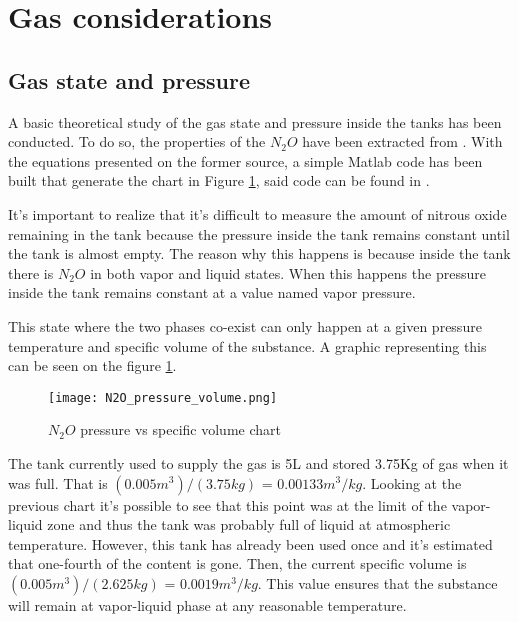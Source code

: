 
\section*{Gas considerations}

\subsection*{Gas state and pressure}

A basic theoretical study of the gas state and pressure inside the tanks has been conducted. To do so, the properties of the $N_2O$ have been extracted from \cite{n2oReference}. With the equations presented on the former source, a simple Matlab code has been built that generate the chart in Figure \ref{fig:N2O_P_V_graph}, said code can be found in \cite{MatlabPVchart}.

It's important to realize that it's difficult to measure the amount of nitrous oxide remaining in the tank because the pressure inside the tank remains constant until the tank is almost empty. The reason why this happens is because inside the tank there is $N_2O$ in both vapor and liquid states. When this happens the pressure inside the tank remains constant at a value named vapor pressure.

This state where the two phases co-exist can only happen at a given pressure temperature and specific volume of the substance. A graphic representing this can be seen on the figure \ref{fig:N2O_P_V_graph}.

\begin{figure}[h]
  \centering
  \texttt{[image: N2O\_pressure\_volume.png]}
  \caption{$N_2O$ pressure vs specific volume chart}
  \label{fig:N2O_P_V_graph}
\end{figure}

The tank currently used to supply the gas is 5L and stored 3.75Kg of gas when it was full. That is $(0.005 m^3) / (3.75 kg)$ = $0.00133 m^3/kg$. Looking at the previous chart it's possible to see that this point was at the limit of the vapor-liquid zone and thus the tank was probably full of liquid at atmospheric temperature. However, this tank has already been used once and it's estimated that one-fourth of the content is gone. Then, the current specific volume is $(0.005 m^3) / (2.625 kg)$ = $0.0019 m^3/kg$. This value ensures that the substance will remain at vapor-liquid phase at any reasonable temperature.

